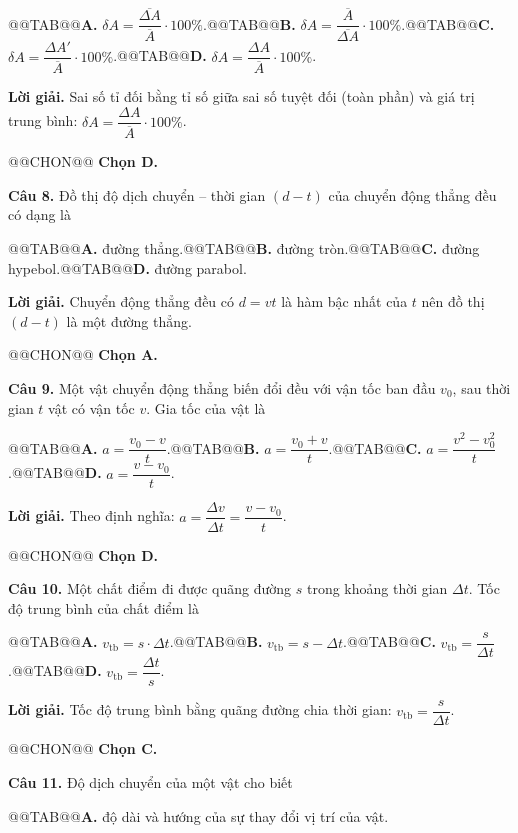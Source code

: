\documentclass{article}
\begin{document}
@@TAB@@\textbf{A.} $\delta A = \dfrac{\overline{\Delta A}}{\overline{A}} \cdot 100\%$.@@TAB@@\textbf{B.} $\delta A = \dfrac{\overline{A}}{\overline{\Delta A}} \cdot 100\%$.@@TAB@@\textbf{C.} $\delta A = \dfrac{\Delta A'}{\overline{A}} \cdot 100\%$.@@TAB@@\textbf{D.} $\delta A = \dfrac{\Delta A}{\overline{A}} \cdot 100\%$.

\textbf{Lời giải.} Sai số tỉ đối bằng tỉ số giữa sai số tuyệt đối (toàn phần) và giá trị trung bình: $\delta A = \dfrac{\Delta A}{\overline{A}} \cdot 100\%$.

@@CHON@@ \textbf{Chọn D.}

\textbf{Câu 8.} Đồ thị độ dịch chuyển -- thời gian $(d - t)$ của chuyển động thẳng đều có dạng là

@@TAB@@\textbf{A.} đường thẳng.@@TAB@@\textbf{B.} đường tròn.@@TAB@@\textbf{C.} đường hypebol.@@TAB@@\textbf{D.} đường parabol.

\textbf{Lời giải.} Chuyển động thẳng đều có $d = vt$ là hàm bậc nhất của $t$ nên đồ thị $(d - t)$ là một đường thẳng.

@@CHON@@ \textbf{Chọn A.}

\textbf{Câu 9.} Một vật chuyển động thẳng biến đổi đều với vận tốc ban đầu $v_0$, sau thời gian $t$ vật có vận tốc $v$. Gia tốc của vật là

@@TAB@@\textbf{A.} $a = \dfrac{v_0 - v}{t}$.@@TAB@@\textbf{B.} $a = \dfrac{v_0 + v}{t}$.@@TAB@@\textbf{C.} $a = \dfrac{v^2 - v_0^2}{t}$.@@TAB@@\textbf{D.} $a = \dfrac{v - v_0}{t}$.

\textbf{Lời giải.} Theo định nghĩa: $a = \dfrac{\Delta v}{\Delta t} = \dfrac{v - v_0}{t}$.

@@CHON@@ \textbf{Chọn D.}

\textbf{Câu 10.} Một chất điểm đi được quãng đường $s$ trong khoảng thời gian $\Delta t$. Tốc độ trung bình của chất điểm là

@@TAB@@\textbf{A.} $v_{\text{tb}} = s \cdot \Delta t$.@@TAB@@\textbf{B.} $v_{\text{tb}} = s - \Delta t$.@@TAB@@\textbf{C.} $v_{\text{tb}} = \dfrac{s}{\Delta t}$.@@TAB@@\textbf{D.} $v_{\text{tb}} = \dfrac{\Delta t}{s}$.

\textbf{Lời giải.} Tốc độ trung bình bằng quãng đường chia thời gian: $v_{\text{tb}} = \dfrac{s}{\Delta t}$.

@@CHON@@ \textbf{Chọn C.}

\textbf{Câu 11.} Độ dịch chuyển của một vật cho biết

@@TAB@@\textbf{A.} độ dài và hướng của sự thay đổi vị trí của vật.
\end{document}
